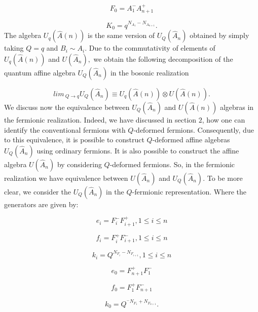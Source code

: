 \documentclass[a4paper,12pt,thmsa]{article}
\begin{document}
\begin{equation}
F_{0}=A_{1}^{-}A_{n+1}^{+}
\end{equation}

\begin{equation}
K_0=q^{N_{A_1}-N_{A_{n+1}}}.
\end{equation}
The algebra $U_q(\hat A(n))$ is the same version of $U_Q(\hat
A_n)$ obtained by simply taking $Q=q$ and $B_i\sim A_i.$ Due to
the commutativity of elements of $U_q(\hat A(n))$ and $U(\hat
A_n),$ we obtain the following decomposition of the quantum affine
algebra $U_Q(\hat A_n)$ in the bosonic realization

\[
lim\, _{Q\rightarrow q}U_Q(\hat A_n)\equiv U_q(\hat A(n))\otimes
U(\hat A(n)).
\]
We discuss now the equivalence between $U_Q(\hat A_n)$ and $U(\hat A(n))$
algebras in the fermionic realization. Indeed, we have discussed in section $%
2$, how one can identify the conventional fermions with $Q$-deformed
fermions. Consequently, due to this equivalence, it is possible to construct
$Q$-deformed affine algebras $U_Q(\hat A_n)$ using ordinary fermions. It is
also possible to construct the affine algebra $U(\hat A_n)$ by considering $Q
$-deformed fermions. So, in the fermionic realization we have equivalence
between $U(\hat A_n)$ and $U_Q(\hat A_n).$ To be more clear, we consider the
$U_Q(\hat A_n)$ in the $Q$-fermionic representation. Where the generators
are given by:

\begin{equation}
e_i=F_i^{-}F_{i+1}^{+},1\leq i\leq n
\end{equation}

\begin{equation}
f_i=F_i^{+}F_{i+1}^{-},1\leq i\leq n
\end{equation}

\begin{equation}
k_i=Q^{N_{F_i}-N_{F_{i+1}}},1\leq i\leq n
\end{equation}

\begin{equation}
e_0=F_{n+1}^{+}F_1^{-}
\end{equation}

\begin{equation}
f_{0}=F_{1}^{+}F_{n+1}^{-}
\end{equation}

\begin{equation}
k_0=Q^{^{-}N_{F_1}+N_{F_{n+1}}}.
\end{equation}
\end{document}
